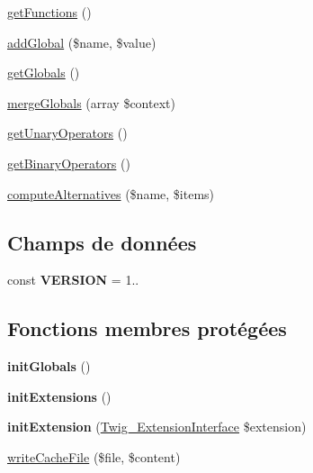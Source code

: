 \begin{DoxyCompactItemize}
\item 
\hyperlink{class_twig___environment_a131c2522f07821f77cd1d038c216031b}{get\+Functions} ()
\item 
\hyperlink{class_twig___environment_ad967754d97f0c9ccd329246fa9255808}{add\+Global} (\$name, \$value)
\item 
\hyperlink{class_twig___environment_ae3a26252ce6efe503698085a7ed69dad}{get\+Globals} ()
\item 
\hyperlink{class_twig___environment_a7e84fd2f4a105b68c7167060ae59b87d}{merge\+Globals} (array \$context)
\item 
\hyperlink{class_twig___environment_a03f904feb2595160e2329a31e3246b3a}{get\+Unary\+Operators} ()
\item 
\hyperlink{class_twig___environment_ac1c8ecccd7414ea56428a303bc47f66b}{get\+Binary\+Operators} ()
\item 
\hyperlink{class_twig___environment_ac9eaf340606e898687d353a69f1a0b61}{compute\+Alternatives} (\$name, \$items)
\end{DoxyCompactItemize}
\subsection*{Champs de données}
\begin{DoxyCompactItemize}
\item 
const {\bfseries V\+E\+R\+S\+I\+ON} = \textquotesingle{}1..\textquotesingle{}\hypertarget{class_twig___environment_af71005841ce53adac00581ab0ba24c1f}{}\label{class_twig___environment_af71005841ce53adac00581ab0ba24c1f}

\end{DoxyCompactItemize}
\subsection*{Fonctions membres protégées}
\begin{DoxyCompactItemize}
\item 
{\bfseries init\+Globals} ()\hypertarget{class_twig___environment_a09fabb543f6dd22f9e668ef8f3102312}{}\label{class_twig___environment_a09fabb543f6dd22f9e668ef8f3102312}

\item 
{\bfseries init\+Extensions} ()\hypertarget{class_twig___environment_a481cddce0a61550e4616074158cf84f5}{}\label{class_twig___environment_a481cddce0a61550e4616074158cf84f5}

\item 
{\bfseries init\+Extension} (\hyperlink{interface_twig___extension_interface}{Twig\+\_\+\+Extension\+Interface} \$extension)\hypertarget{class_twig___environment_ae8f85d11b80d3c925bb98f6711795e87}{}\label{class_twig___environment_ae8f85d11b80d3c925bb98f6711795e87}

\item 
\hyperlink{class_twig___environment_afef0e86e8f08fa1d0c4006ce65bede10}{write\+Cache\+File} (\$file, \$content)
\end{DoxyCompactItemize}
